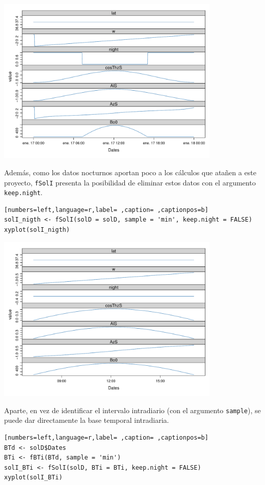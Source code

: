 \begin{center}
\includegraphics[width=0.8\textwidth]{figuras/codigo-solI.pdf}
\end{center}
  Además, como los datos nocturnos aportan poco a los cálculos que atañen a este proyecto, \texttt{fSolI} presenta la posibilidad de eliminar estos datos con el argumento \texttt{keep.night}.
\begin{lstlisting}[numbers=left,language=r,label= ,caption= ,captionpos=b]
solI_nigth <- fSolI(solD = solD, sample = 'min', keep.night = FALSE)
xyplot(solI_nigth)
\end{lstlisting}

\begin{center}
\includegraphics[width=0.8\textwidth]{figuras/codigo-solInight.pdf}
\end{center}
  Aparte, en vez de identificar el intervalo intradiario (con el argumento \texttt{sample}), se puede dar directamente la base temporal intradiaria.
\begin{lstlisting}[numbers=left,language=r,label= ,caption= ,captionpos=b]
BTd <- solD$Dates
BTi <- fBTi(BTd, sample = 'min')
solI_BTi <- fSolI(solD, BTi = BTi, keep.night = FALSE)
xyplot(solI_BTi)
\end{lstlisting}

